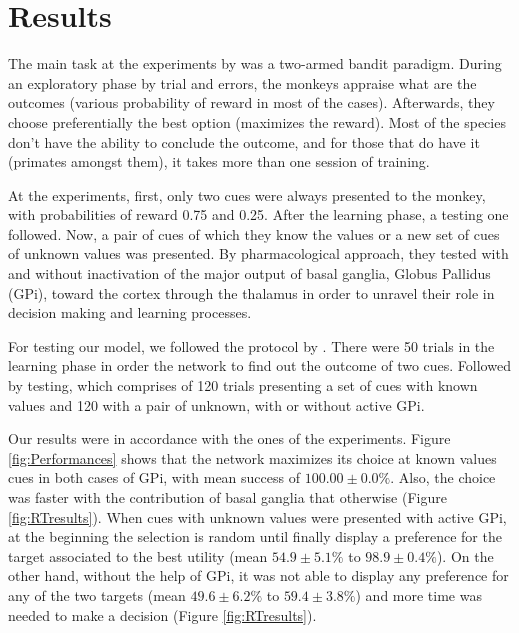 \section{Results}

The main task at the experiments by \citet{Piron2015} was a two-armed bandit
paradigm. During an exploratory phase by trial and errors, the monkeys appraise
what are the outcomes (various probability of reward in most of the
cases). Afterwards, they choose preferentially the best option (maximizes the
reward). Most of the species don't have the ability to conclude the outcome,
and for those that do have it (primates amongst them), it takes more than one
session of training.

At the experiments, first, only two cues were always presented to the monkey,
with probabilities of reward 0.75 and 0.25. After the learning phase, a testing
one followed. Now, a pair of cues of which they know the values or a new set of
cues of unknown values was presented. By pharmacological approach, they tested
with and without inactivation of the major output of basal ganglia, Globus
Pallidus (GPi), toward the cortex through the thalamus in order to unravel
their role in decision making and learning processes.

For testing our model, we followed the protocol by \citet{Piron2015}. There
were 50 trials in the learning phase in order the network to find out the
outcome of two cues. Followed by testing, which comprises of 120 trials
presenting a set of cues with known values and 120 with a pair of unknown, with
or without active GPi.

Our results were in accordance with the ones of the experiments. Figure
\ref{fig:Performances} shows that the network maximizes its choice at known
values cues in both cases of GPi, with mean success of $100.00\pm 0.0\%$. Also,
the choice was faster with the contribution of basal ganglia that otherwise
(Figure \ref{fig:RTresults}). When cues with unknown values were presented with
active GPi, at the beginning the selection is random until finally display a
preference for the target associated to the best utility (mean $54.9 \pm 5.1\%$
to $98.9 \pm 0.4\%$). On the other hand, without the help of GPi, it was not
able to display any preference for any of the two targets (mean $49.6 \pm
6.2\%$ to $59.4\pm 3.8\%$) and more time was needed to make a decision (Figure
\ref{fig:RTresults}).
